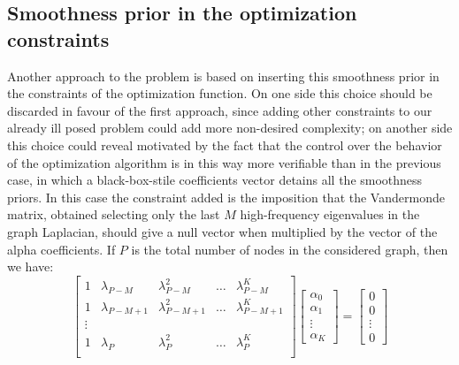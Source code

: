 \subsection{Smoothness prior in the optimization constraints}
Another approach to the problem is based on inserting this smoothness prior in the constraints of the optimization function. On one side this choice should be discarded in favour of the first approach, since adding other constraints to our already ill posed problem could add more non-desired complexity; on another side this choice could reveal motivated by the fact that the control over the behavior of the optimization algorithm is in this way more verifiable than in the previous case, in which a black-box-stile coefficients vector detains all the smoothness priors. In this case the constraint added is the imposition that the Vandermonde matrix, obtained selecting only the last $M$ high-frequency eigenvalues in the graph Laplacian, should give a null vector when multiplied by the vector of the alpha coefficients. If $P$ is the total number of nodes in the considered graph, then we have:
\begin{equation}
  \begin{bmatrix}
    1 & \lambda_{P-M} & \lambda_{P-M}^2 & \dots & \lambda_{P-M}^{K} \\
    1 & \lambda_{P-M+1} & \lambda_{P-M+1}^2 & \dots & \lambda_{P-M+1}^{K} \\
    \vdots & & \\
    1 & \lambda_P & \lambda_P^2 & \dots & \lambda_P^K \\
\end{bmatrix}
\begin{bmatrix}
  \alpha_0 \\
  \alpha_1 \\
  \vdots \\
  \alpha_K
\end{bmatrix}
=
\begin{bmatrix}
  0\\
  0\\
  \vdots\\
  0
\end{bmatrix}
\end{equation}

